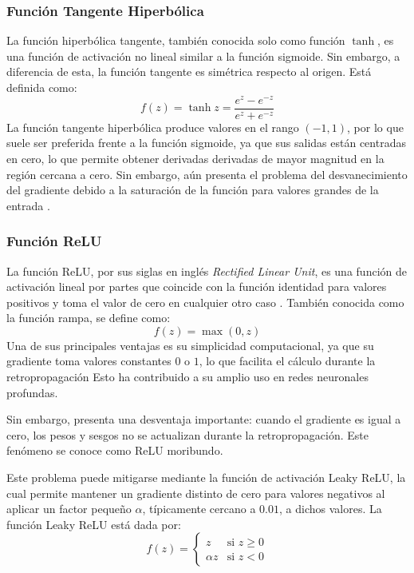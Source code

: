 \subsubsection{Función Tangente Hiperbólica}
La función hiperbólica tangente, también conocida solo como función $\tanh$, es una
función de activación no lineal similar a la función sigmoide. 
Sin embargo, a diferencia de esta, la función tangente es simétrica respecto al origen.
Está definida como:
\begin{equation}
    f(z) = \tanh{z} = \frac{e^{z}-e^{-z}}{e^{z}+e^{-z}}
\end{equation}
La función tangente hiperbólica produce valores en el rango $(-1,1)$, por lo que suele ser
preferida frente a la función sigmoide, ya que sus salidas están centradas en
cero, lo que permite obtener derivadas derivadas de mayor magnitud en la región cercana 
a cero.
Sin embargo, aún presenta el problema del desvanecimiento del gradiente debido a la
saturación de la función para valores grandes de la entrada \parencite{szandala2020review}.

\subsubsection{Función ReLU}
La función ReLU, por sus siglas en inglés \textit{Rectified Linear Unit}, es una función 
de activación lineal por partes que coincide con la función identidad para valores positivos y toma el 
valor de cero en cualquier otro caso \parencite{DBLP:journals/corr/abs-2101-09957}. También conocida como la función rampa, se define como:
\begin{equation}
    f(z) = \max(0,z)
    \label{eq:relu}
\end{equation}
Una de sus principales ventajas es su simplicidad computacional, ya que su gradiente toma valores constantes 
$0$ o $1$, lo que facilita el cálculo durante la retropropagación
Esto ha contribuido a su amplio uso en redes neuronales profundas.
\medskip

Sin embargo, presenta una desventaja importante: cuando el gradiente es igual a cero, 
los pesos y sesgos no se actualizan durante la retropropagación. Este fenómeno se conoce 
como \guillemotleft ReLU moribundo\guillemotright.
\medskip

Este problema puede mitigarse mediante la función de activación Leaky ReLU, la cual 
permite mantener un gradiente distinto de cero para valores negativos al aplicar 
un factor pequeño $\alpha$, típicamente cercano a $0.01$, a dichos valores. La función Leaky
ReLU está dada por:
\begin{equation}
    f(z) = \begin{cases}
        z & \text{si } z \ge 0\\
        \alpha z & \text{si } z < 0
    \end{cases}
\end{equation}

